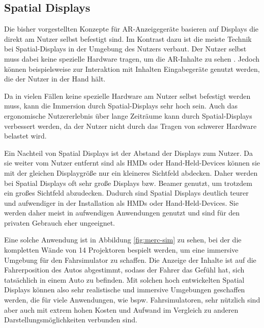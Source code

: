   

  \subsection{Spatial Displays}

  Die bisher vorgestellten Konzepte für AR-Anzeigegeräte basieren auf Displays die direkt am Nutzer selbst befestigt sind.
  Im Kontrast dazu ist die meiste Technik bei Spatial-Displays in der Umgebung des Nutzers verbaut.
  Der Nutzer selbst muss dabei keine spezielle Hardware tragen, um die AR-Inhalte zu sehen \autocite[]{bimber2006modern}.
  Jedoch können beispielsweise zur Interaktion mit Inhalten Eingabegeräte genutzt werden, die der Nutzer in der Hand hält.

  Da in vielen Fällen keine spezielle Hardware am Nutzer selbst befestigt werden muss, kann die Immersion durch Spatial-Displays sehr hoch sein.
  Auch das ergonomische Nutzererlebnis über lange Zeiträume kann durch Spatial-Displays verbessert werden, da der Nutzer nicht durch das Tragen von schwerer Hardware belastet wird.

  Ein Nachteil von Spatial Displays ist der Abstand der Displays zum Nutzer.
  Da sie weiter vom Nutzer entfernt sind als HMDs oder Hand-Held-Devices können sie mit der gleichen Displaygröße nur ein kleineres Sichtfeld abdecken.
  Daher werden bei Spatial Displays oft sehr große Displays bzw. Beamer genutzt, um trotzdem ein großes Sichtfeld abzudecken.
  Dadurch sind Spatial Displays deutlich teurer und aufwendiger in der Installation als HMDs oder Hand-Held-Devices.
  Sie werden daher meist in aufwendigen Anwendungen genutzt und sind für den privaten Gebrauch eher ungeeignet.

  Eine solche Anwendung ist in Abbildung \ref{fig:merc-sim} zu sehen, bei der die kompletten Wände von 14 Projektoren bespielt werden, um eine immersive Umgebung für den Fahrsimulator zu schaffen.
  Die Anzeige der Inhalte ist auf die Fahrerposition des Autos abgestimmt, sodass der Fahrer das Gefühl hat, sich tatsächlich in einem Auto zu befinden.
  Mit solchen hoch entwickelten Spatial Displays können also sehr realistische und immersive Umgebungen geschaffen werden, die für viele Anwendungen, wie bspw. Fahrsimulatoren, sehr nützlich sind aber auch mit extrem hohen Kosten und Aufwand im Vergleich zu anderen Darstellungsmöglichkeiten verbunden sind.

